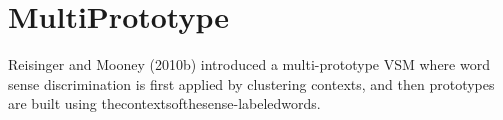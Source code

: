 \section{MultiPrototype}

Reisinger and Mooney (2010b) introduced a multi-prototype VSM where word sense discrimination is ﬁrst applied by clustering contexts, and then prototypes are built using thecontextsofthesense-labeledwords. 

